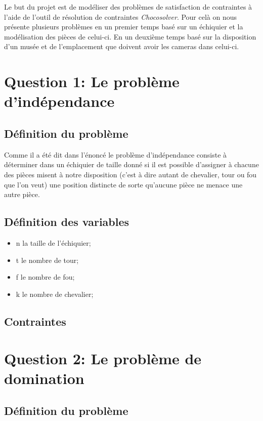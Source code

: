 \documentclass[letterpaper]{article}
\begin{document}
Le but du projet est de modéliser des problèmes de satisfaction de contraintes
à l'aide de l'outil de résolution de contraintes \emph{Chocosolver}. Pour celà
on nous présente plusieurs problèmes en un premier temps basé sur un échiquier
et la modélisation des pièces de celui-ci. En un deuxième temps basé sur la
disposition d'un musée et de l'emplacement que doivent avoir les cameras dans
celui-ci.

\section{Question 1: Le problème d'indépendance}

\subsection{Définition du problème}

Comme il a été dit dans l'énoncé le problème d'indépendance consiste à
déterminer dans un échiquier de taille donné si il est possible d'assigner à
chacune des pièces misent à notre disposition (c'est à dire autant de
chevalier, tour ou fou que l'on veut) une position distincte de sorte qu'aucune
pièce ne menace une autre pièce.

\subsection{Définition des variables}

\begin{itemize}
   \item n la taille de l'échiquier;
   \item t le nombre de tour;
   \item f le nombre de fou;
   \item k le nombre de chevalier;
\end{itemize}

\subsection{Contraintes}

\section{Question 2: Le problème de domination}

\subsection{Définition du problème}
\end{document}
